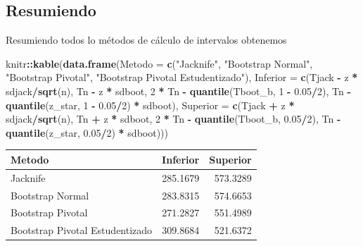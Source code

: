 \documentclass[
  12pt,
]{book}
\newenvironment{Shaded}{\begin{snugshade}}{\end{snugshade}}
\newcommand{\DataTypeTok}[1]{\textcolor[rgb]{0.13,0.29,0.53}{#1}}
\newcommand{\DecValTok}[1]{\textcolor[rgb]{0.00,0.00,0.81}{#1}}
\newcommand{\FloatTok}[1]{\textcolor[rgb]{0.00,0.00,0.81}{#1}}
\newcommand{\KeywordTok}[1]{\textcolor[rgb]{0.13,0.29,0.53}{\textbf{#1}}}
\newcommand{\NormalTok}[1]{#1}
\newcommand{\OperatorTok}[1]{\textcolor[rgb]{0.81,0.36,0.00}{\textbf{#1}}}
\newcommand{\StringTok}[1]{\textcolor[rgb]{0.31,0.60,0.02}{#1}}
\theoremstyle{definition}
\theoremstyle{definition}
\theoremstyle{definition}
\theoremstyle{remark}
\begin{document}
\texttt{}

\hypertarget{resumiendo}{%
\subsection{Resumiendo}\label{resumiendo}}

Resumiendo todos lo métodos de cálculo de intervalos obtenemos

\begin{Shaded}
\begin{Highlighting}[]
\NormalTok{knitr}\OperatorTok{::}\KeywordTok{kable}\NormalTok{(}\KeywordTok{data.frame}\NormalTok{(}\DataTypeTok{Metodo =} \KeywordTok{c}\NormalTok{(}\StringTok{"Jacknife"}\NormalTok{, }\StringTok{"Bootstrap Normal"}\NormalTok{, }
    \StringTok{"Bootstrap Pivotal"}\NormalTok{, }\StringTok{"Bootstrap Pivotal Estudentizado"}\NormalTok{), }
    \DataTypeTok{Inferior =} \KeywordTok{c}\NormalTok{(Tjack }\OperatorTok{-}\StringTok{ }\NormalTok{z }\OperatorTok{*}\StringTok{ }\NormalTok{sdjack}\OperatorTok{/}\KeywordTok{sqrt}\NormalTok{(n), Tn }\OperatorTok{-}\StringTok{ }\NormalTok{z }\OperatorTok{*}\StringTok{ }
\StringTok{        }\NormalTok{sdboot, }\DecValTok{2} \OperatorTok{*}\StringTok{ }\NormalTok{Tn }\OperatorTok{-}\StringTok{ }\KeywordTok{quantile}\NormalTok{(Tboot_b, }\DecValTok{1} \OperatorTok{-}\StringTok{ }\FloatTok{0.05}\OperatorTok{/}\DecValTok{2}\NormalTok{), }
\NormalTok{        Tn }\OperatorTok{-}\StringTok{ }\KeywordTok{quantile}\NormalTok{(z_star, }\DecValTok{1} \OperatorTok{-}\StringTok{ }\FloatTok{0.05}\OperatorTok{/}\DecValTok{2}\NormalTok{) }\OperatorTok{*}\StringTok{ }\NormalTok{sdboot), }
    \DataTypeTok{Superior =} \KeywordTok{c}\NormalTok{(Tjack }\OperatorTok{+}\StringTok{ }\NormalTok{z }\OperatorTok{*}\StringTok{ }\NormalTok{sdjack}\OperatorTok{/}\KeywordTok{sqrt}\NormalTok{(n), Tn }\OperatorTok{+}\StringTok{ }\NormalTok{z }\OperatorTok{*}\StringTok{ }
\StringTok{        }\NormalTok{sdboot, }\DecValTok{2} \OperatorTok{*}\StringTok{ }\NormalTok{Tn }\OperatorTok{-}\StringTok{ }\KeywordTok{quantile}\NormalTok{(Tboot_b, }\FloatTok{0.05}\OperatorTok{/}\DecValTok{2}\NormalTok{), }
\NormalTok{        Tn }\OperatorTok{-}\StringTok{ }\KeywordTok{quantile}\NormalTok{(z_star, }\FloatTok{0.05}\OperatorTok{/}\DecValTok{2}\NormalTok{) }\OperatorTok{*}\StringTok{ }\NormalTok{sdboot)))}
\end{Highlighting}
\end{Shaded}

\begin{tabular}{l|r|r}
\hline
Metodo & Inferior & Superior\\
\hline
Jacknife & 285.1679 & 573.3289\\
\hline
Bootstrap Normal & 283.8315 & 574.6653\\
\hline
Bootstrap Pivotal & 271.2827 & 551.4989\\
\hline
Bootstrap Pivotal Estudentizado & 309.8684 & 521.6372\\
\hline
\end{tabular}
\end{document}
